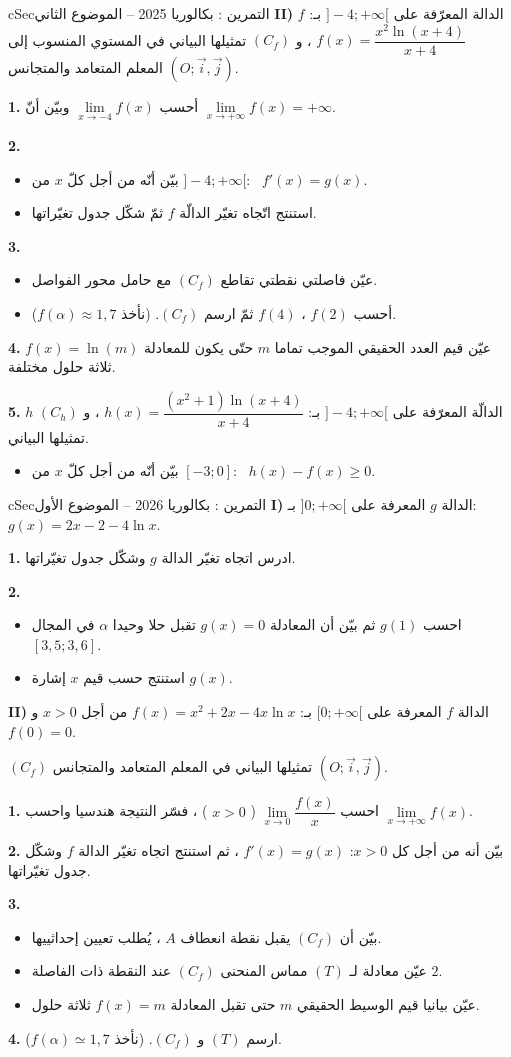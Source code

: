 \documentclass[12pt,a4paper]{article}
\newenvironment{BOX}[2]{\begin{otherlanguage}{english}\begin{arbox}{#1}{#2}}{\end{arbox}\end{otherlanguage}}
\newcounter{exo}
\newenvironment{tamrin}[1]{\stepcounter{exo}\begin{BOX}{cSec}{التمرين \theexo: #1}}{\end{BOX}}
\newenvironment{sq}{\begin{itemize}[leftmargin=2.4em,itemsep=3pt]}{\end{itemize}}
\newcommand{\qa}{\item[(أ)]}\newcommand{\qb}{\item[(ب)]}\newcommand{\qc}{\item[(جـ)]}\newcommand{\qd}{\item[(د)]}\newcommand{\qe}{\item[(هـ)]}
\newcommand{\QQ}[1]{\par\smallskip\textbf{#1.} }
\begin{document}
\begin{tamrin}{بكالوريا 2025 -- الموضوع الثاني}
\textbf{II)} $f$ الدالة المعرّفة على $]-4;+\infty[$ بـ: \ $f(x)=\dfrac{x^2\ln(x+4)}{x+4}$ ، و $(C_f)$ تمثيلها البياني في المستوي المنسوب إلى المعلم المتعامد والمتجانس $(O;\vec i,\vec j)$.
\QQ{1} أحسب $\lim\limits_{x\to-4}f(x)$ وبيّن أنّ $\lim\limits_{x\to+\infty}f(x)=+\infty$.
\QQ{2}
\begin{sq}
\qa بيّن أنّه من أجل كلّ $x$ من $]-4;+\infty[$: \ $f'(x)=g(x)$.
\qb استنتج اتّجاه تغيّر الدالّة $f$ ثمّ شكّل جدول تغيّراتها.
\end{sq}
\QQ{3}
\begin{sq}
\qa عيّن فاصلتي نقطتي تقاطع $(C_f)$ مع حامل محور الفواصل.
\qb أحسب $f(2)$ ، $f(4)$ ثمّ ارسم $(C_f)$. (نأخذ $f(\alpha)\approx1{,}7$).
\end{sq}
\QQ{4} عيّن قيم العدد الحقيقي الموجب تماما $m$ حتّى يكون للمعادلة $f(x)=\ln(m)$ ثلاثة حلول مختلفة.
\QQ{5} $h$ الدالّة المعرّفة على $]-4;+\infty[$ بـ: $h(x)=\dfrac{(x^2+1)\ln(x+4)}{x+4}$ ، و $(C_h)$ تمثيلها البياني.
\begin{sq}
\qa بيّن أنّه من أجل كلّ $x$ من $[-3;0]$: \ $h(x)-f(x)\geqslant0$.
\end{sq}
\end{tamrin}

\begin{tamrin}{بكالوريا 2026 -- الموضوع الأول}
\textbf{I)} الدالة $g$ المعرفة على $]0;+\infty[$ بـ: $g(x)=2x-2-4\ln x$.
\QQ{1} ادرس اتجاه تغيّر الدالة $g$ وشكّل جدول تغيّراتها.
\QQ{2}
\begin{sq}
\qa احسب $g(1)$ ثم بيّن أن المعادلة $g(x)=0$ تقبل حلا وحيدا $\alpha$ في المجال $[3{,}5;3{,}6]$.
\qb استنتج حسب قيم $x$ إشارة $g(x)$.
\end{sq}

\textbf{II)} الدالة $f$ المعرفة على $[0;+\infty[$ بـ: $f(x)=x^2+2x-4x\ln x$ من أجل $x>0$ و $f(0)=0$.

$(C_f)$ تمثيلها البياني في المعلم المتعامد والمتجانس $(O;\vec i,\vec j)$.
\QQ{1} احسب $\lim\limits_{x\to0}\dfrac{f(x)}{x}$ ( $x>0$ ) ، فسّر النتيجة هندسيا واحسب $\lim\limits_{x\to+\infty}f(x)$.
\QQ{2} بيّن أنه من أجل كل $x>0$: $f'(x)=g(x)$ ، ثم استنتج اتجاه تغيّر الدالة $f$ وشكّل جدول تغيّراتها.
\QQ{3}
\begin{sq}
\qa بيّن أن $(C_f)$ يقبل نقطة انعطاف $A$ ، يُطلب تعيين إحداثييها.
\qb عيّن معادلة لـ $(T)$ مماس المنحنى $(C_f)$ عند النقطة ذات الفاصلة $2$.
\qc عيّن بيانيا قيم الوسيط الحقيقي $m$ حتى تقبل المعادلة $f(x)=m$ ثلاثة حلول.
\end{sq}
\QQ{4} ارسم $(T)$ و $(C_f)$. (نأخذ $f(\alpha)\simeq1{,}7$).
\end{tamrin}
\end{document}
